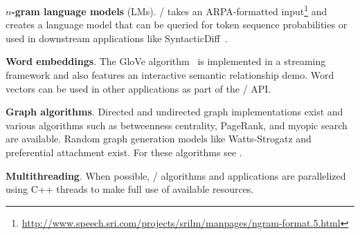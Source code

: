 \textbf{$n$-gram language models} (LMs).
\meta/ takes an ARPA-formatted
input\footnote{\url{http://www.speech.sri.com/projects/srilm/manpages/ngram-format.5.html}}
and creates a language model that can be queried for token sequence
probabilities or used in downstream applications like
SyntacticDiff~\citep{syndiff}.

\textbf{Word embeddings}.
The GloVe algorithm~\citep{glove} is implemented in a streaming framework and
also features an interactive semantic relationship demo. Word vectors can be
used in other applications as part of the \meta/ API\@.

\textbf{Graph algorithms}.
Directed and undirected graph implementations exist and various algorithms such
as betweenness centrality, PageRank, and myopic search are available. Random
graph generation models like Watts-Strogatz and preferential attachment exist.
For these algorithms see \citet{networks}.

\textbf{Multithreading}.
When possible, \meta/ algorithms and applications are parallelized using C++
threads to make full use of available resources.
